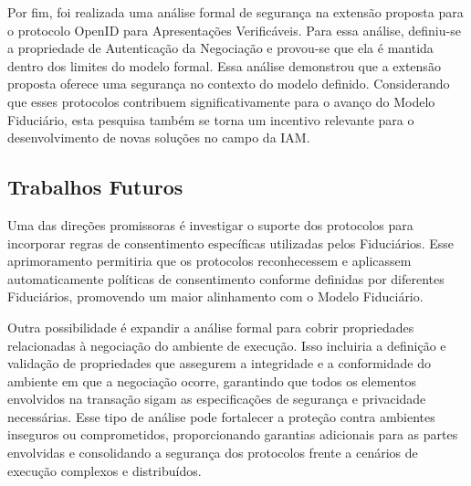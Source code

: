 Por fim, foi realizada uma análise formal de segurança na extensão proposta para o protocolo OpenID para Apresentações Verificáveis. Para essa análise, definiu-se a propriedade de Autenticação da Negociação e provou-se que ela é mantida dentro dos limites do modelo formal. Essa análise demonstrou que a extensão proposta oferece uma segurança no contexto do modelo definido. Considerando que esses protocolos contribuem significativamente para o avanço do Modelo Fiduciário, esta pesquisa também se torna um incentivo relevante para o desenvolvimento de novas soluções no campo da IAM.

\subsection*{Trabalhos Futuros}

Uma das direções promissoras é investigar o suporte dos protocolos para incorporar regras de consentimento específicas utilizadas pelos Fiduciários. Esse aprimoramento permitiria que os protocolos reconhecessem e aplicassem automaticamente políticas de consentimento conforme definidas por diferentes Fiduciários, promovendo um maior alinhamento com o Modelo Fiduciário.

Outra possibilidade é expandir a análise formal para cobrir propriedades relacionadas à negociação do ambiente de execução. Isso incluiria a definição e validação de propriedades que assegurem a integridade e a conformidade do ambiente em que a negociação ocorre, garantindo que todos os elementos envolvidos na transação sigam as especificações de segurança e privacidade necessárias. Esse tipo de análise pode fortalecer a proteção contra ambientes inseguros ou comprometidos, proporcionando garantias adicionais para as partes envolvidas e consolidando a segurança dos protocolos frente a cenários de execução complexos e distribuídos.